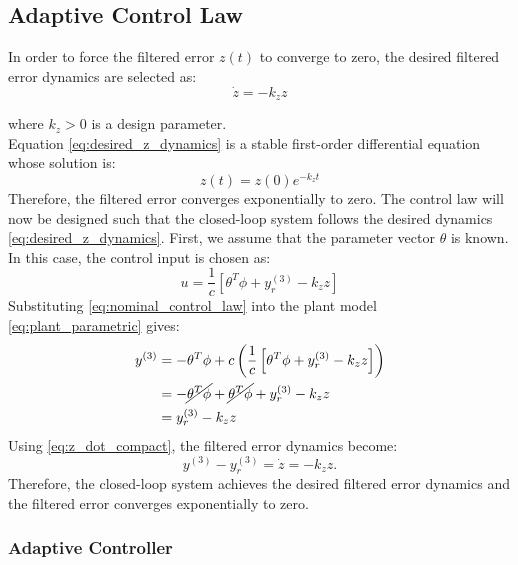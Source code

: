 \subsection{Adaptive Control Law}

In order to force the filtered error \(z(t)\) to converge to zero, the desired filtered error dynamics are selected as:
\begin{equation}
\dot{z}
=
-k_z z
\label{eq:desired_z_dynamics}
\end{equation}

where \(k_z>0\) is a design parameter.
\\

\noindent Equation \eqref{eq:desired_z_dynamics} is a stable first-order differential equation whose solution is:
\begin{equation}
z(t)
=
z(0)e^{-k_z t}
\end{equation}
Therefore, the filtered error converges exponentially to zero. The control law will now be designed such that the closed-loop system follows the desired dynamics \eqref{eq:desired_z_dynamics}.
\noindent First, we assume that the parameter vector \(\theta\) is known. In this case, the control input is chosen as:
\begin{equation}
u
=
\frac{1}{c}
\left[
\theta^T\phi
+
y_r^{(3)}
-
k_z z
\right]
\label{eq:nominal_control_law}
\end{equation}
Substituting \eqref{eq:nominal_control_law} into the plant model \eqref{eq:plant_parametric} gives:
\begin{align}
y^{(3)}
&=
-\theta^T\phi
+
c
\left(
\frac{1}{c}
\left[
\theta^T\phi
+
y_r^{(3)}
-
k_z z
\right]
\right) \\
&=
-\cancel{\theta^T\phi}
+
\cancel{\theta^T\phi}
+
y_r^{(3)}
-
k_z z \\
&=
y_r^{(3)}
-
k_z z
\end{align}
Using \eqref{eq:z_dot_compact}, the filtered error dynamics become:
\begin{equation}
y^{(3)} - y_r^{(3)}
=
\dot{z}
=
-k_z z.
\end{equation}
Therefore, the closed-loop system achieves the desired filtered error dynamics and the filtered error converges exponentially to zero.

\subsubsection*{Adaptive Controller}

